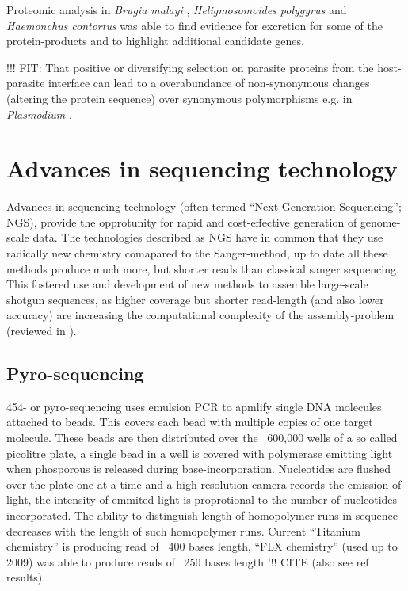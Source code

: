 Proteomic analysis in \textit{Brugia malayi}
\cite{pmid19352421,pmid18958170}, \textit{Heligmosomoides polygyrus}
\cite{pmid21722761} and \textit{Haemonchus contortus}
\cite{pmid12576473} was able to find evidence for excretion for some
of the protein-products and to highlight additional candidate genes.

!!! FIT: 
That positive or diversifying selection on parasite proteins from the
host-parasite interface can lead to a overabundance of non-synonymous
changes (altering the protein sequence) over synonymous polymorphisms
e.g. in \textit{Plasmodium} \cite{pmid7630387}.

\section{Advances in sequencing technology}
\label{sec:ad-seq}

Advances in sequencing technology (often termed ``Next Generation
Sequencing''; NGS), provide the opprotunity for rapid and
cost-effective generation of genome-scale data. The technologies
described as NGS have in common that they use radically new chemistry
comapared to the Sanger-method, up to date all these methods produce
much more, but shorter reads than classical sanger sequencing. This
fostered use and development of new methods to assemble large-scale
shotgun sequences, as higher coverage but shorter read-length (and
also lower accuracy) are increasing the computational complexity of
the assembly-problem (reviewed in \cite{pmid20211242}).



\subsection{Pyro-sequencing}
\label{sec:pyro-seq}


454- or pyro-sequencing uses emulsion PCR to apmlify single DNA
molecules attached to beads. This covers each bead with multiple
copies of one target molecule. These beads are then distributed over
the ~600,000 wells of a so called picolitre plate, a single bead in a
well is covered with polymerase emitting light when phosporous is
released during base-incorporation. Nucleotides are flushed over the
plate one at a time and a high resolution camera records the emission
of light, the intensity of emmited light is proprotional to the number
of nucleotides incorporated. The ability to distinguish length of
homopolymer runs in sequence decreases with the length of such
homopolymer runs. Current ``Titanium chemistry'' is producing read of
~400 bases length, ``FLX chemistry'' (used up to 2009) was able to
produce reads of ~250 bases length !!! CITE (also see ref results).

